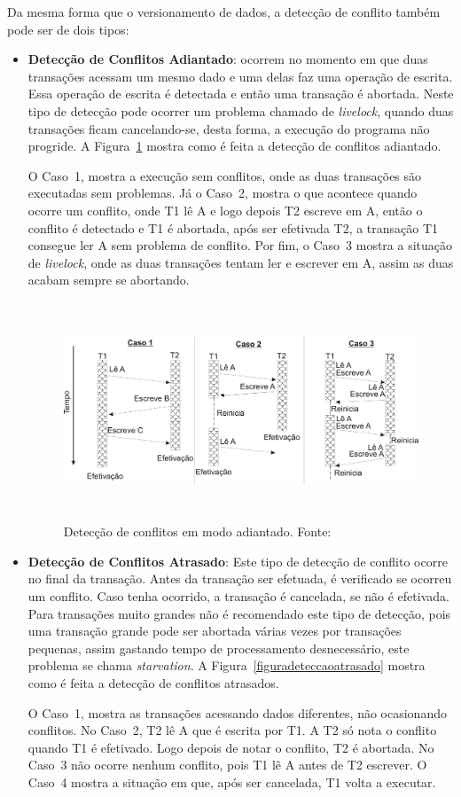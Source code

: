 \documentclass[diss,capa]{texufpel}
\begin{document}
Da mesma forma que o versionamento de dados, a detecção de conflito também pode ser de dois tipos:

\begin{itemize}
\item \textbf{Detecção de Conflitos Adiantado}: ocorrem no momento em que duas transações acessam um mesmo dado e uma delas faz uma operação de escrita. Essa operação de escrita é detectada e então uma transação é abortada. Neste tipo de detecção pode ocorrer um problema chamado de \emph{livelock}, quando duas transações ficam cancelando-se, desta forma, a execução do programa não progride. A Figura~\ref{figuradeteccaoadiantado} mostra como é feita a detecção de conflitos adiantado.

O Caso~1, mostra a execução sem conflitos, onde as duas transações são executadas sem problemas. Já o Caso~2, mostra o que acontece quando ocorre um conflito, onde T1 lê A e logo depois T2 escreve em A, então o conflito é detectado e T1 é abortada, após ser efetivada T2, a transação T1 consegue ler A sem problema de conflito. Por fim, o Caso~3 mostra a situação de \emph{livelock}, onde as duas transações tentam ler e escrever em A, assim as duas acabam sempre se abortando.

\begin{figure}[!htp]
\centering
\includegraphics[height=6.5cm]{images/conflitoadiantado.png}
\caption{Detecção de conflitos em modo adiantado. Fonte:~\cite{rigotm}}
\label{figuradeteccaoadiantado}
\end{figure}


\item \textbf{Detecção de Conflitos Atrasado}: Este tipo de detecção de conflito ocorre no final da transação.  Antes da transação ser efetuada, é verificado se ocorreu um conflito. Caso tenha ocorrido, a transação é cancelada, se não é efetivada. Para transações muito grandes não é recomendado este tipo de detecção, pois uma transação grande pode ser abortada várias vezes por transações pequenas, assim gastando tempo de processamento desnecessário, este problema se chama \emph{starvation}. A Figura~\ref{figuradeteccaoatrasado} mostra como é feita a detecção de conflitos atrasados.

O Caso~1, mostra as transações acessando dados diferentes, não ocasionando conflitos. No Caso~2, T2 lê A que é escrita por T1. A T2 só nota o conflito quando T1 é efetivado. Logo depois de notar o conflito, T2 é abortada. No Caso~3 não ocorre nenhum conflito, pois T1 lê A antes de T2 escrever. O Caso~4 mostra a situação em que, após ser cancelada, T1 volta a executar.
\end{itemize}
\end{document}
